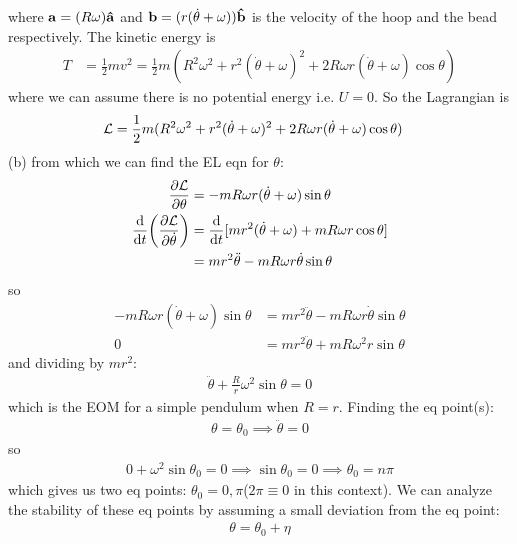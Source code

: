 \documentclass[../hw.tex]{subfiles}
\begin{document}
where $\vb a = (R\omega) \vu a$ and $\vb b = (r(\dot \theta + \omega)) \vu b$ is the velocity 
of the hoop and the bead respectively. The kinetic energy is
\begin{align*}
    T &= \frac{1}{2} m v^2 = \frac{1}{2} m
        (R^2 \omega^2 + r^2 (\dot \theta + \omega)^2 + 2R\omega r(\dot \theta + \omega)\cos\theta)
\end{align*}
where we can assume there is no potential energy i.e. $U = 0$. So the Lagrangian is
\begin{align*}
    \mathcal{L} &= \frac{1}{2} m (R^2 \omega^2 + r^2 (\dot \theta + \omega)^2 + 2R\omega r(\dot \theta + \omega)\cos\theta)
\end{align*}
(b) from which we can find the EL eqn for $\theta$:
\begin{align*}
    \pdv{\mathcal{L}}{\theta} &= -mR\omega r(\dot \theta + \omega) \sin\theta \\
    \dv{t}(\pdv{\mathcal{L}}{\dot \theta}) &= \dv{t} [mr^2(\dot \theta + \omega) + mR\omega r\cos\theta] \\
    &= mr^2 \ddot \theta - mR\omega r \dot \theta \sin\theta
\end{align*}
so 
\begin{align*}
    -mR\omega r(\dot \theta + \omega) \sin\theta &= mr^2 \ddot \theta - mR\omega r \dot \theta \sin\theta \\
    0 &= mr^2 \ddot \theta + mR\omega^2 r \sin\theta 
\end{align*}
and dividing by $mr^2$:
\begin{align*}
    \ddot \theta + \frac{R}{r} \omega^2 \sin\theta = 0
\end{align*}
which is the EOM for a simple pendulum when $R = r$. Finding the eq point(s):
\begin{align*}
    \theta = \theta_0 \implies \ddot \theta = 0
\end{align*}
so
\begin{align*}
    0 + \omega^2 \sin\theta_0 = 0 \implies \sin\theta_0 = 0 \implies \theta_0 = n\pi
\end{align*}
which gives us two eq points: $\theta_0 = 0, \pi$($2\pi \equiv 0$ in this context). 
We can analyze the stability of these eq points by assuming a small deviation from the eq point:
\begin{align*}
    \theta = \theta_0 + \eta
\end{align*}
\end{document}
